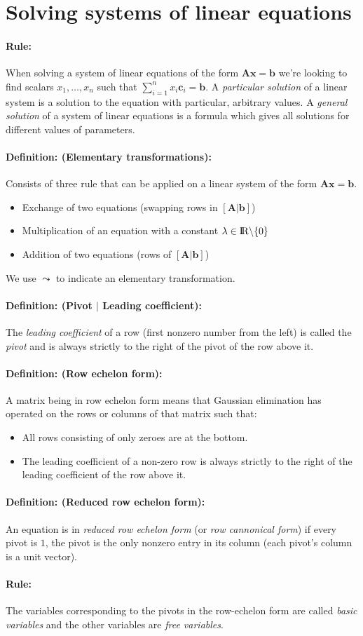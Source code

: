 \documentclass[12pt]{article}
\newcommand{\R}{{\rm I\!R}}
\newcommand{\A}{{\bm{A}}}
\newcommand{\xdefinition}[2]{\paragraph{\colorbox{#1!30}{\textbf{Definition:}} (#2):}}
\newcommand{\xrule}[1]{\paragraph{\colorbox{#1!30}{\textbf{Rule:}}}}
\begin{document}
\section{Solving systems of linear equations}

\xrule{green} When solving a system of linear equations of the form $\bm{Ax} = \bm{b}$ we're looking to find scalars $x_1, \dots, x_n$ such that $\sum\nolimits_{i=1}^{n} x_i \bm{c}_i = \bm{b}$. A \textit{particular solution} of a linear system is a solution to the equation with particular, arbitrary values. A \textit{general solution} of a system of linear equations is a formula which gives all solutions for different values of parameters.

\xdefinition{green}{Elementary transformations} Consists of three rule that can be applied on a linear system of the form $\A \bm{x} = \bm{b}$.
%
\begin{itemize}
	\item Exchange of two equations (swapping rows in $[\A | \bm{b}]$)
	\item Multiplication of an equation with a constant $\lambda \in \R \backslash \{0\}$
	\item Addition of two equations (rows of $[\A | \bm{b}]$)
\end{itemize}
%
We use $\leadsto$ to indicate an elementary transformation.

\xdefinition{blue}{Pivot $|$ Leading coefficient} The \textit{leading coefficient} of a row (first nonzero number from the left) is called the \textit{pivot} and is always strictly to the right of the pivot of the row above it.

\xdefinition{blue}{Row echelon form} A matrix being in row echelon form means that Gaussian elimination has operated on the rows or columns of that matrix such that:
%
\begin{itemize}
	\item All rows consisting of only zeroes are at the bottom.
	\item The leading coefficient of a non-zero row is always strictly to the right of the leading coefficient of the row above it.
\end{itemize}

\xdefinition{blue}{Reduced row echelon form} An equation is in \textit{reduced row echelon form} (or \textit{row cannonical form}) if every pivot is $1$, the pivot is the only nonzero entry in its column (each pivot's column is a unit vector).

\xrule{blue} The variables corresponding to the pivots in the row-echelon form are called \textit{basic variables} and the other variables are \textit{free variables}.
\end{document}
